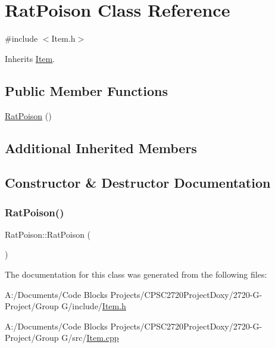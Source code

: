 \hypertarget{class_rat_poison}{}\section{Rat\+Poison Class Reference}
\label{class_rat_poison}


{\ttfamily \#include $<$Item.\+h$>$}



Inherits \mbox{\hyperlink{class_item}{Item}}.

\subsection*{Public Member Functions}
\begin{DoxyCompactItemize}
\item 
\mbox{\hyperlink{class_rat_poison_adfd6a5ede1b1af093e40a791e53143a9}{Rat\+Poison}} ()
\end{DoxyCompactItemize}
\subsection*{Additional Inherited Members}


\subsection{Constructor \& Destructor Documentation}
\mbox{\label{class_rat_poison_adfd6a5ede1b1af093e40a791e53143a9}} 
\subsubsection{\texorpdfstring{Rat\+Poison()}{RatPoison()}}
{\footnotesize\ttfamily Rat\+Poison\+::\+Rat\+Poison (\begin{DoxyParamCaption}{ }\end{DoxyParamCaption})}



The documentation for this class was generated from the following files\+:\begin{DoxyCompactItemize}
\item 
A\+:/\+Documents/\+Code Blocks Projects/\+C\+P\+S\+C2720\+Project\+Doxy/2720-\/\+G-\/\+Project/\+Group G/include/\mbox{\hyperlink{_item_8h}{Item.\+h}}\item 
A\+:/\+Documents/\+Code Blocks Projects/\+C\+P\+S\+C2720\+Project\+Doxy/2720-\/\+G-\/\+Project/\+Group G/src/\mbox{\hyperlink{_item_8cpp}{Item.\+cpp}}\end{DoxyCompactItemize}
